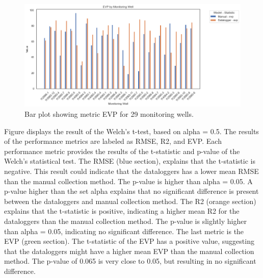 \begin{figure}[h]
    \centering
    \begin{minipage}{0.48\textwidth}
        \centering
        \includegraphics[width=\linewidth]{frontmatter/Rozenburg-fig/evproz2.png} %
        \caption{Bar plot showing metric EVP for 29 monitoring wells.}
        \label{barevp}
    \end{minipage}\hfill
\end{figure}
Figure  displays the result of the Welch's t-test, based on alpha = 0.5. The results of the performance metrics are labeled as RMSE, R2, and EVP. Each performance metric provides the results of the t-statistic and p-value of the Welch's statistical test. The RMSE (blue section), explains that the t-statistic is negative. This result could indicate that the dataloggers has a lower mean RMSE than the manual collection method. The p-value is higher than alpha = 0.05. A p-value higher than the set alpha explains that no significant difference is present between the dataloggers and manual collection method. The R2 (orange section) explains that the t-statistic is positive, indicating a higher mean R2 for the dataloggers than the manual collection method. The p-value is slightly higher than alpha = 0.05, indicating no significant difference. The last metric is the EVP (green section). The t-statistic of the EVP has a positive value, suggesting that the dataloggers might have a higher mean EVP than the manual collection method. The p-value of 0.065 is very close to 0.05, but resulting in no significant difference. 

